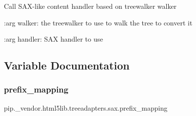 \begin{DoxyVerb}Call SAX-like content handler based on treewalker walker

:arg walker: the treewalker to use to walk the tree to convert it

:arg handler: SAX handler to use\end{DoxyVerb}
 

\subsection{Variable Documentation}
\mbox{\label{namespacepip_1_1__vendor_1_1html5lib_1_1treeadapters_1_1sax_a77c831479ceaedd9bd8a30178640db48}} 
\subsubsection{\texorpdfstring{prefix\+\_\+mapping}{prefix\_mapping}}
{\footnotesize\ttfamily pip.\+\_\+vendor.\+html5lib.\+treeadapters.\+sax.\+prefix\+\_\+mapping}

